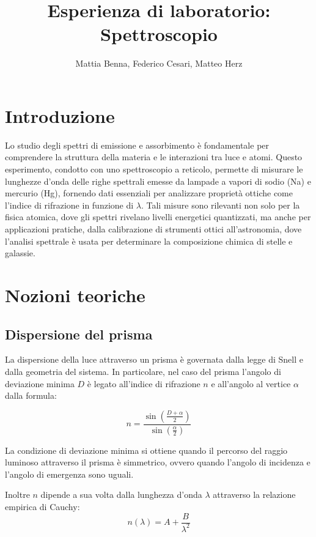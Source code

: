\documentclass[9pt,a4paper,twocolumn,twoside]{tau-class/tau}
\title{Esperienza di laboratorio: Spettroscopio}
\author[b,c,3]{Mattia Benna, Federico Cesari, Matteo Herz}
\begin{document}
		
    \maketitle 
    \thispagestyle{firststyle} 
    \tauabstract

\section{Introduzione}
Lo studio degli spettri di emissione e assorbimento è fondamentale per comprendere la struttura della materia e le interazioni tra luce e atomi. Questo esperimento, condotto con uno spettroscopio a reticolo, permette di misurare le lunghezze d’onda delle righe spettrali emesse da lampade a vapori di sodio (Na) e mercurio (Hg), fornendo dati essenziali per analizzare proprietà ottiche come l’indice di rifrazione in funzione di $\lambda$. Tali misure sono rilevanti non solo per la fisica atomica, dove gli spettri rivelano livelli energetici quantizzati, ma anche per applicazioni pratiche, dalla calibrazione di strumenti ottici all’astronomia, dove l’analisi spettrale è usata per determinare la composizione chimica di stelle e galassie.

\section{Nozioni teoriche}
\subsection*{Dispersione del prisma}
La dispersione della luce attraverso un prisma è governata dalla legge di Snell e dalla geometria del sistema. In particolare, nel caso del prisma l’angolo di deviazione minima $D$ è legato all’indice di rifrazione $n$ e all’angolo al vertice $\alpha$ dalla formula:

\begin{equation}
n = \frac{\sin\left(\frac{D + \alpha}{2}\right)}{\sin\left(\frac{\alpha}{2}\right)}
\end{equation}

\noindent La condizione di deviazione minima si ottiene quando il percorso del raggio luminoso attraverso il prisma è simmetrico, ovvero quando l'angolo di incidenza e l'angolo di emergenza sono uguali.

Inoltre $n$ dipende a sua volta dalla lunghezza d'onda $\lambda$ attraverso la relazione empirica di Cauchy:
\begin{equation}
n(\lambda) = A + \frac{B}{\lambda^2}
\end{equation}
\end{document}
